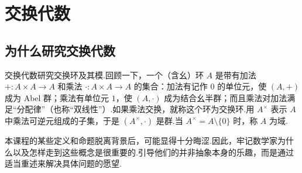 \chapter{交换代数}\label{chap:galois-commutative-algebra}
\section{为什么研究交换代数}\label{sec:galois-1-1}
交换代数研究交换环及其模.回顾一下，一个（含幺）环 $A$ 是带有加法 $+\colon A\times A\longrightarrow A$ 和乘法 $\cdot\colon A\times A\longrightarrow A$ 的集合：加法有记作 $0$ 的单位元，使 $(A,+)$ 成为 Abel 群；乘法有单位元 $1$，使 $(A,\cdot)$ 成为结合幺半群；而且乘法对加法满足``分配律''（也称``双线性''）.如果乘法交换，就称这个环为交换环.用 $A^\times$ 表示 $A$ 中乘法可逆元组成的子集，于是 $(A^\times,\cdot)$ 是群.当 $A^\times=A\setminus\{0\}$ 时，称 $A$ 为域.

本课程的某些定义和命题脱离背景后，可能显得十分晦涩.因此，牢记数学家为什么以及怎样走到这些概念是很重要的.引导他们的并非抽象本身的乐趣，而是通过适当重述来解决具体问题的愿望.

